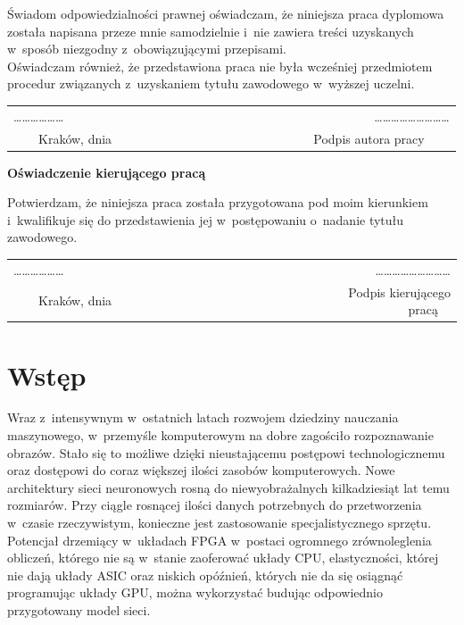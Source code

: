 \documentclass[12pt, oneside, a4paper]{article}
\begin{document}
\noindent Świadom odpowiedzialności prawnej oświadczam, że niniejsza praca
dyplomowa została napisana przeze mnie samodzielnie i~nie zawiera treści
uzyskanych w~sposób niezgodny z~obowiązującymi przepisami.\\

\noindent Oświadczam również, że przedstawiona praca nie była wcześniej
przedmiotem procedur związanych z~uzyskaniem
tytułu zawodowego w~wyższej uczelni.
\vspace{2cm}
\begin{center}
\begin{tabular}{lr}
\ldots\ldots\ldots\ldots\ldots\ldots~~~~~~~~~~~~~~~~~~~~~~~~~~~~~~~~~~~~~~&
\ldots\ldots\ldots\ldots\ldots\ldots\ldots\ldots\ldots \\
{~~~~Kraków, dnia} & {Podpis autora pracy~~~~}
\end{tabular}
\end{center}
\vspace{5cm}
\begin{flushleft}
\large \textbf{Oświadczenie kierującego pracą}
\end{flushleft}

\noindent Potwierdzam, że niniejsza praca została przygotowana pod moim
kierunkiem i~kwalifikuje się do przedstawienia jej w~postępowaniu
o~nadanie tytułu zawodowego.
\vspace{2cm}
\begin{center}
\begin{tabular}{lr}
\ldots\ldots\ldots\ldots\ldots\ldots~~~~~~~~~~~~~~~~~~~~~~~~~~~~~~~~~~~~~~&
\ldots\ldots\ldots\ldots\ldots\ldots\ldots\ldots\ldots \\
{~~~~Kraków, dnia} & {Podpis kierującego pracą~~}
\end{tabular}
\end{center}
\vfill

\newpage
\tableofcontents

\newpage
\section*{Wstęp}
%
Wraz z~intensywnym w~ostatnich latach rozwojem dziedziny nauczania maszynowego,
w~przemyśle komputerowym na dobre zagościło rozpoznawanie obrazów. Stało
się to możliwe dzięki nieustającemu postępowi technologicznemu oraz
dostępowi do coraz większej ilości zasobów komputerowych. Nowe architektury
sieci neuronowych rosną do niewyobrażalnych kilkadziesiąt lat temu rozmiarów.
Przy ciągle rosnącej ilości danych potrzebnych do przetworzenia w~czasie
rzeczywistym, konieczne jest zastosowanie specjalistycznego sprzętu.
Potencjał drzemiący w~układach FPGA w~postaci
ogromnego zrównoleglenia obliczeń, którego nie są w~stanie zaoferować układy CPU,
elastyczności, której nie dają układy ASIC oraz
niskich opóźnień, których nie da się osiągnąć programując układy GPU,
można wykorzystać budując odpowiednio przygotowany model sieci.
\end{document}
